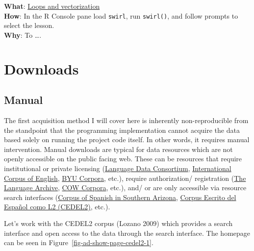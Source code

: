 \documentclass[
  letterpaper,
]{latex/krantz}
\begin{document}
\begin{tcolorbox}[enhanced jigsaw, opacitybacktitle=0.6, breakable, colframe=quarto-callout-tip-color-frame, arc=.35mm, left=2mm, leftrule=.75mm, title=\textcolor{quarto-callout-tip-color}{\faLightbulb}\hspace{0.5em}{Swirl}, opacityback=0, colback=white, toptitle=1mm, rightrule=.15mm, titlerule=0mm, bottomtitle=1mm, bottomrule=.15mm, coltitle=black, colbacktitle=quarto-callout-tip-color!10!white, toprule=.15mm]
\textbf{What}: \href{https://github.com/lin380/swirl}{Loops and
vectorization}\\
\textbf{How}: In the R Console pane load \texttt{swirl}, run
\texttt{swirl()}, and follow prompts to select the lesson.\\
\textbf{Why}: To \ldots.
\end{tcolorbox}

\hypertarget{downloads}{%
\section{Downloads}\label{downloads}}

\hypertarget{manual}{%
\subsection{Manual}\label{manual}}

The first acquisition method I will cover here is inherently
non-reproducible from the standpoint that the programming implementation
cannot acquire the data based solely on running the project code itself.
In other words, it requires manual intervention. Manual downloads are
typical for data resources which are not openly accessible on the public
facing web. These can be resources that require institutional or private
licensing (\href{https://www.ldc.upenn.edu/}{Language Data Consortium},
\href{http://ice-corpora.net/ice/}{International Corpus of English},
\href{https://www.corpusdata.org/}{BYU Corpora}, etc.), require
authorization/ registration (\href{https://archive.mpi.nl/tla/}{The
Language Archive}, \href{https://www.webcorpora.org/}{COW Corpora},
etc.), and/ or are only accessible via resource search interfaces
(\href{https://cesa.arizona.edu/}{Corpus of Spanish in Southern
Arizona}, \href{http://cedel2.learnercorpora.com/}{Corpus Escrito del
Español como L2 (CEDEL2)}, etc.).

Let's work with the CEDEL2 corpus (Lozano 2009) which provides a search
interface and open access to the data through the search interface. The
homepage can be seen in Figure~\ref{fig-ad-show-page-cedel2-1}.
\end{document}
